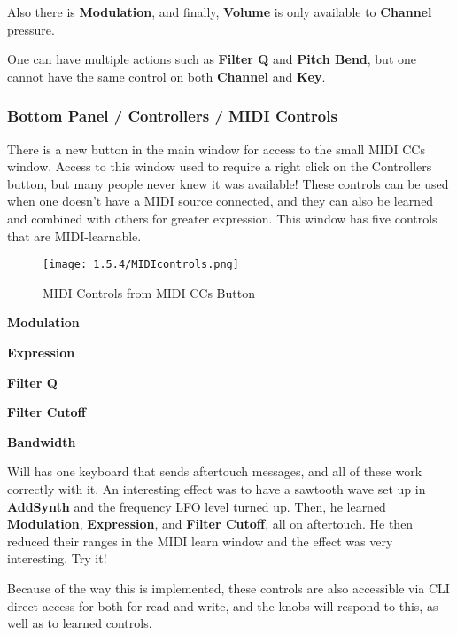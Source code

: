 Also there is \textbf{Modulation}, and finally, \textbf{Volume} is only available
to \textbf{Channel} pressure.

One can have multiple actions such as
\textbf{Filter Q} and \textbf{Pitch Bend},
but one cannot have the same control on both
\textbf{Channel} and \textbf{Key}.

\subsubsection{Bottom Panel / Controllers / MIDI Controls}
\label{subsubsec:bottom_panel_controllers_midi_controls}

   There is a new button in the main window for access to the small MIDI CCs
   window. Access to this window used to require a right click on the
   Controllers button, but many people never knew it was available!  These
   controls can be used when one doesn't have a MIDI source connected, and they
   can also be learned and combined with others for greater expression.  This
   window has five controls that are MIDI-learnable.

\begin{figure}[H]
   \centering
   \texttt{[image: 1.5.4/MIDIcontrols.png]}
   \caption{MIDI Controls from MIDI CCs Button}
   \label{fig:instrument_midi_controllers}
\end{figure}

   \begin{enumber}
      \item \textbf{Modulation}
      \item \textbf{Expression}
      \item \textbf{Filter Q}
      \item \textbf{Filter Cutoff}
      \item \textbf{Bandwidth}
   \end{enumber}

   \setcounter{ItemCounter}{0}      %

   Will has one keyboard that sends aftertouch messages, and all of these work
   correctly with it. An interesting effect was to have a sawtooth wave set up
   in \textbf{AddSynth} and the frequency LFO level turned up.  Then, he
   learned \textbf{Modulation}, \textbf{Expression}, and \textbf{Filter
   Cutoff}, all on aftertouch. He then reduced their ranges in the MIDI learn
   window and the effect was very interesting.  Try it!

   Because of the way this is implemented, these controls are also accessible
   via CLI direct access for both for read and write, and the knobs will
   respond to this, as well as to learned controls.

